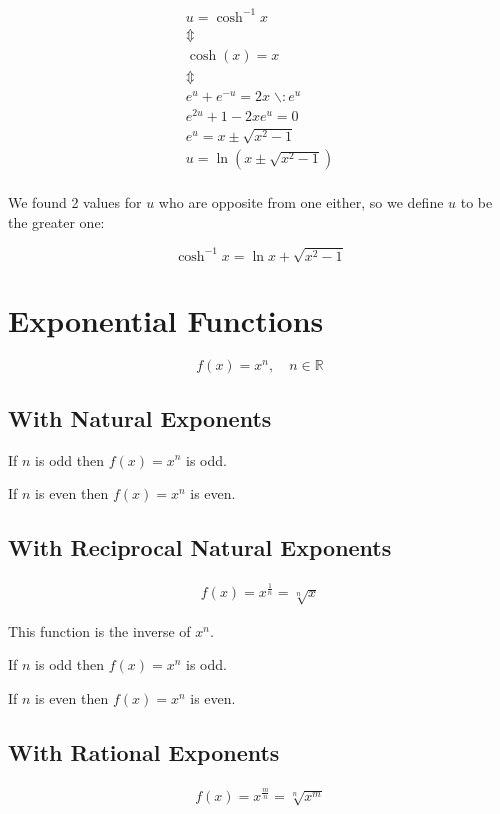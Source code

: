 \documentclass[00_complete]{subfiles}
\begin{document}
$$
\begin{gathered}
    u = \cosh^{-1}x \\
    \Updownarrow \\
    \cosh(x) = x \\ \Updownarrow \\
    e^u + e^{-u} =2x \; \backslash : e^u\\
    e^{2u} + 1 - 2xe^u = 0 \\
    e^u = x \pm \sqrt{x^2-1} \\
    u = \ln(x\pm\sqrt{x^2-1}) \\
\end{gathered}
$$

We found 2 values for $u$ who are opposite from one either, so we define $u$ to
be the greater one:

$$\boxed{\cosh^{-1}x = \ln{x+\sqrt{x^2-1}}}$$

\section{Exponential Functions}

$$f(x) = x^n, \quad n \in \mathbb{R}$$

\subsection{With Natural Exponents}

If $n$ is odd then $f(x)=x^n$ is odd.

If $n$ is even then $f(x)=x^n$ is even.

\subsection{With Reciprocal Natural Exponents}

$$
\begin{gathered}
    f(x)= x^{\frac{1}{n}} = \sqrt[n]{x}
\end{gathered}
$$

This function is the inverse of $x^n$.

If $n$ is odd then $f(x)=x^n$ is odd.

If $n$ is even then $f(x)=x^n$ is even.

\subsection{With Rational Exponents}

$$
\begin{gathered}
    f(x) = x^{\frac{m}{n}} = \sqrt[n]{x^m}
\end{gathered}
$$
\end{document}
